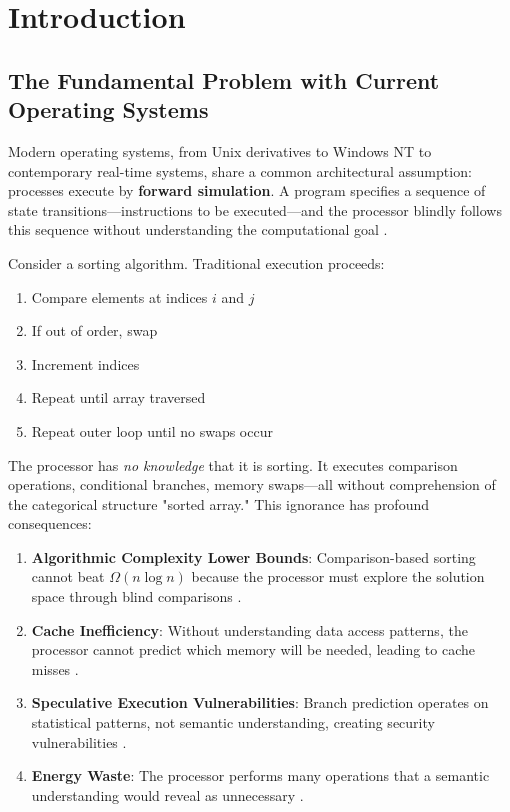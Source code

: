 \documentclass[twocolumn,10pt]{article}
\theoremstyle{definition}
\theoremstyle{remark}
\begin{document}
\section{Introduction}
\label{sec:introduction}

\subsection{The Fundamental Problem with Current Operating Systems}

Modern operating systems, from Unix derivatives to Windows NT to contemporary real-time systems, share a common architectural assumption: processes execute by \textbf{forward simulation}. A program specifies a sequence of state transitions—instructions to be executed—and the processor blindly follows this sequence without understanding the computational goal \citep{tanenbaum2014modern,silberschatz2018operating}.

Consider a sorting algorithm. Traditional execution proceeds:
\begin{enumerate}
    \item Compare elements at indices $i$ and $j$
    \item If out of order, swap
    \item Increment indices
    \item Repeat until array traversed
    \item Repeat outer loop until no swaps occur
\end{enumerate}

The processor has \emph{no knowledge} that it is sorting. It executes comparison operations, conditional branches, memory swaps—all without comprehension of the categorical structure "sorted array." This ignorance has profound consequences:

\begin{enumerate}
    \item \textbf{Algorithmic Complexity Lower Bounds}: Comparison-based sorting cannot beat $\Omega(n \log n)$ because the processor must explore the solution space through blind comparisons \citep{cormen2009introduction}.

    \item \textbf{Cache Inefficiency}: Without understanding data access patterns, the processor cannot predict which memory will be needed, leading to cache misses \citep{hennessy2011computer}.

    \item \textbf{Speculative Execution Vulnerabilities}: Branch prediction operates on statistical patterns, not semantic understanding, creating security vulnerabilities \citep{kocher2019spectre}.

    \item \textbf{Energy Waste}: The processor performs many operations that a semantic understanding would reveal as unnecessary \citep{mudge2001power}.
\end{enumerate}
\end{document}
